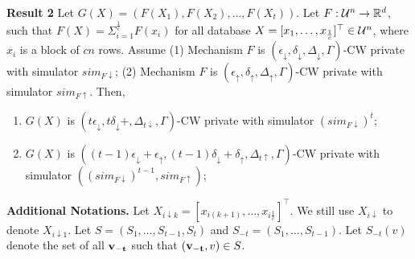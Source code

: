 \documentclass[11pt]{article}
\begin{document}
{\bf Result 2} Let $G(X) = (F(X_{1}), F(X_{2}), \dots ,F( X_{t}))$. Let $F: {\cal U}^{n} \rightarrow \mathbb{R}^{d}$, such that $F(X)=\Sigma_{i=1}^{\frac{1}{c}} F(x_{i})$ for all database $X=[x_{1},\dots , x_{\frac{1}{c}}]^{\top} \in {\cal U}^{n}$, where $x_{i}$ is a block of $cn$ rows. Assume (1) Mechanism $F$ is $(\epsilon_{\downarrow}, \delta_{\downarrow}, \Delta_{\downarrow}, \Gamma)$-CW private with simulator $sim_{F\downarrow}$; (2) Mechanism $F$ is $(\epsilon_{\uparrow}, \delta_{\uparrow}, \Delta_{\uparrow}, \Gamma)$-CW private with simulator $sim_{F\uparrow}$. Then, 
\begin{enumerate}
\item $G(X)$ is $(t\epsilon_{\downarrow}, t\delta_{\downarrow}+, \Delta_{t\downarrow}, \Gamma)$-CW private with simulator $(sim_{F\downarrow})^{t}$;
\item $G(X)$ is $((t-1)\epsilon_{\downarrow}+\epsilon_{\uparrow}, (t-1)\delta_{\downarrow}+\delta_{\uparrow}, \Delta_{t\uparrow}, \Gamma)$-CW private with simulator $((sim_{F\downarrow})^{t-1}, sim_{F\uparrow})$;
\end{enumerate}
{\bf Additional Notations.} Let $X_{i \downarrow k} = [x_{i (k+1)}, \dots , x_{i \frac{1}{c}}]^{\top}$. We still use $X_{i \downarrow}$ to denote $X_{i \downarrow 1}$. Let $S=(S_{1}, \dots, S_{t-1}, S_{t})$ and $S_{-t} = (S_{1}, \dots, S_{t-1})$. Let $S_{-t}(v)$ denote the set of all $\bf v_{-t}$ such that $({\bf v_{-t}}, v) \in S$.
\\
\end{document}
